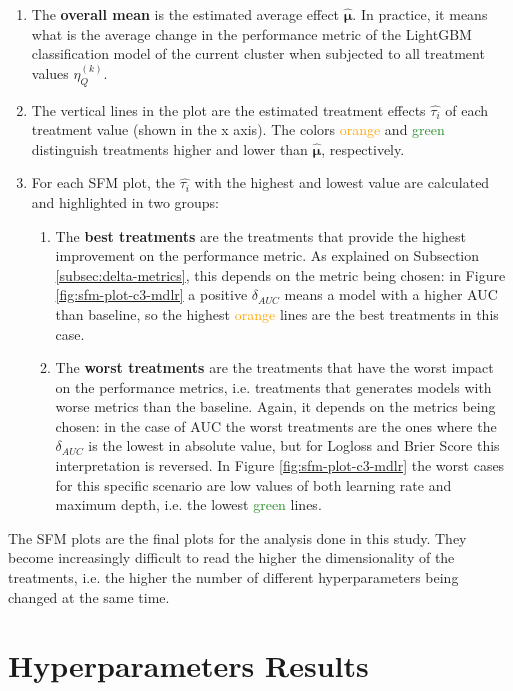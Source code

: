 \begin{enumerate}
    \item The \textbf{overall mean} is the estimated average effect $\hat{\bm{\mu}}$. In practice, it means what is the average change in the performance metric of the LightGBM classification model of the current cluster when subjected to all treatment values  $\eta^{(k)}_Q$.
    \item The vertical lines in the plot are the estimated treatment effects $\hat{\tau_i}$ of each treatment value (shown in the x axis). The colors \textcolor{orange}{orange} and \textcolor{ForestGreen}{green} distinguish treatments higher and lower than  $\hat{\bm{\mu}}$, respectively.
    \item For each SFM plot, the $\hat{\tau_i}$ with the highest and lowest value are calculated and highlighted in two groups:
    \begin{enumerate}
        \item The \textbf{best treatments} are the treatments that provide the highest improvement on the performance metric. As explained on Subsection \ref{subsec:delta-metrics}, this depends on the metric being chosen: in Figure \ref{fig:sfm-plot-c3-mdlr} a positive $\delta_{AUC}$ means a model with a higher AUC than baseline, so the highest \textcolor{orange}{orange} lines are the best treatments in this case.
        \item The \textbf{worst treatments} are the treatments that have the worst impact on the performance metrics, i.e. treatments that generates models with worse metrics than the baseline. Again, it depends on the metrics being chosen: in the case of AUC the worst treatments are the ones where the $\delta_{AUC}$ is the lowest in absolute value, but for Logloss and Brier Score this interpretation is reversed. In Figure \ref{fig:sfm-plot-c3-mdlr} the worst cases for this specific scenario are low values of both learning rate and maximum depth, i.e. the lowest \textcolor{ForestGreen}{green} lines.
    \end{enumerate}
\end{enumerate}

The SFM plots are the final plots for the analysis done in this study. They become increasingly difficult to read the higher the dimensionality of the treatments, i.e. the higher the number of different hyperparameters being changed at the same time.

\section{Hyperparameters Results}

